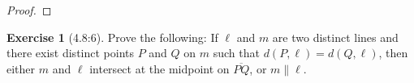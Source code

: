 \documentclass[11pt]{article}		%
\newcommand{\seg}[1]{\overline{#1}}
\theoremstyle{definition}
\newtheorem*{exercise*}{Exercise}
\begin{document}
\begin{proof} 
	
\end{proof}
	
\vspace{1in}

\begin{exercise*}[4.8:6]
	Prove the following: If $\ell$ and $m$ are two distinct lines and there exist distinct points $P$ and $Q$ on $m$ such that $d(P,\ell) = d(Q,\ell)$, then either $m$ and $\ell$ intersect at the midpoint on $\seg{PQ}$, or $m \parallel \ell$.
\end{exercise*}
\end{document}
